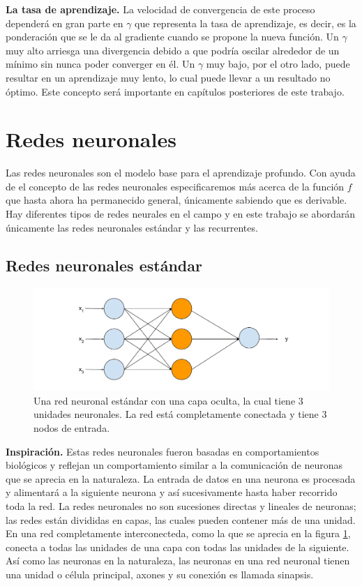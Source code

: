 \textbf{La tasa de aprendizaje.} La velocidad de convergencia de este proceso dependerá en gran parte en $\gamma$ que representa la tasa de aprendizaje, es decir, es la ponderación que se le da al gradiente cuando se propone la nueva función. Un $\gamma$ muy alto arriesga una divergencia debido a que podría oscilar alrededor de un mínimo sin nunca poder converger en él. Un $\gamma$ muy bajo, por el otro lado, puede resultar en un aprendizaje muy lento, lo cual puede llevar a un resultado no óptimo. Este concepto será importante en capítulos posteriores de este trabajo.

\section{Redes neuronales}

Las redes neuronales son el modelo base para el aprendizaje profundo. Con ayuda de el concepto de las redes neuronales especificaremos más acerca de la función $f$ que hasta ahora ha permanecido general, únicamente sabiendo que es derivable. Hay diferentes tipos de redes neurales en el campo y en este trabajo se abordarán únicamente las redes neuronales estándar y las recurrentes.

\subsection{Redes neuronales estándar}

\begin{figure}
	\includegraphics[scale=.6]{Figures/standardnn.pdf}
	\caption{Una red neuronal estándar con una capa oculta, la cual tiene 3 unidades neuronales. La red está completamente conectada y tiene 3 nodos de entrada.}
	\label{fig:standardnn}
\end{figure}

\textbf{Inspiración.} Estas redes neuronales fueron basadas en comportamientos biológicos y reflejan un comportamiento similar a la comunicación de neuronas que se aprecia en la naturaleza. La entrada de datos en una neurona es procesada y alimentará a la siguiente neurona y así sucesivamente hasta haber recorrido toda la red. La redes neuronales no son sucesiones directas y lineales de neuronas; las redes están divididas en capas, las cuales pueden contener más de una unidad. En una red completamente interconecteda, como la que se aprecia en la figura \ref{fig:standardnn}, conecta a todas las unidades de una capa con todas las unidades de la siguiente. Así como las neuronas en la naturaleza, las neuronas en una red neuronal tienen una unidad o célula principal, axones y su conexión es llamada sinapsis.


